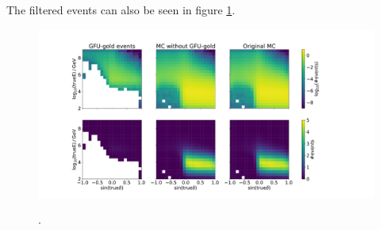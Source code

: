 The filtered events can also be seen in figure \ref{fig:energy}.

\begin{figure}
    \centering
    \includegraphics[width=\linewidth]{Plots/03_data/cleaned_mc_energy_test.pdf}
    \label{fig:energy}
    \caption{.}
\end{figure}

